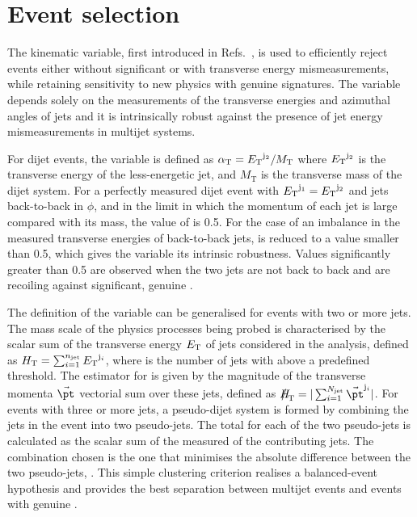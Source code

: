 \section{Event selection}
\label{sec:event_selection}

The \alphat kinematic variable, first introduced in
Refs.~\cite{Randall:2008rw, RA1Paper}, is used to efficiently reject
events either without significant \met or with transverse energy
mismeasurements, while retaining sensitivity to new physics with
genuine \met signatures. The variable \alphat depends solely on the
measurements of the transverse energies and azimuthal angles of jets
and it is intrinsically robust against the presence of jet energy
mismeasurements in multijet systems.

For dijet events, the \alphat variable is defined as $\alpha_{\text T} =
{E_{\text T}}^{\rm j_2}/M_\text{T}$ where ${E_{\text T}}^{\rm j_2}$ is the transverse
energy of the less-energetic jet, and $M_\text{T}$ is the transverse
mass of the dijet system. 
For a perfectly measured dijet event with ${E_{\text T}}^{\mathrm{j}_1} =
{E_{\text T}}^{\mathrm{j}_2}$ and jets back-to-back in $\phi$, and in the limit
in which the momentum of each jet is large compared with its mass, the
value of \alphat is 0.5. For the case of an imbalance in the measured
transverse energies of back-to-back jets, \alphat is reduced to a
value smaller than 0.5, which gives the variable its intrinsic
robustness. Values significantly greater than 0.5 are observed when the two jets
are not back to back and are recoiling against significant, genuine
\met.

The definition of the \alphat variable can be generalised for events
with two or more jets. The mass scale of the physics processes being
probed is characterised by the scalar sum of the transverse energy
${E_{\text T}}$ of jets considered in the analysis, defined as $\mbox{$H_\text{T}$} =
\sum_{i=1}^{n_{\text{jet}}} {E_{\text T}}^{\mathrm{j}_i}$, where \njet is the number of
jets with \Et above a predefined threshold. The estimator for \met is
given by the magnitude of the transverse momenta $\vec{\pt}$ vectorial
sum over these jets, defined as $\mht = |\sum_{i=1}^{N_\text{jet}}
\vec{\pt}^{\mathrm{j}_i}|$.  For events with three or more jets, a
pseudo-dijet system is formed by combining the jets in the event into
two pseudo-jets. The total \Et for each of the two pseudo-jets is
calculated as the scalar sum of the measured \Et of the contributing
jets. The combination chosen is the one that minimises the absolute
\Et difference between the two pseudo-jets, \dht. This simple
clustering criterion realises a balanced-event hypothesis and provides
the best separation between multijet events and events with genuine
\met. 

